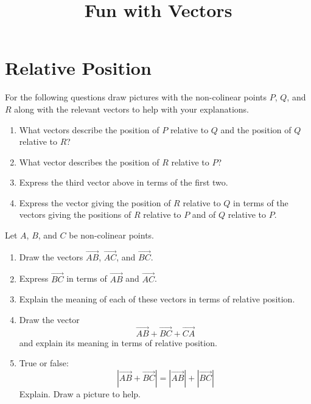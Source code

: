 \documentclass{ximera}
\title{Fun with Vectors}
\begin{document}
\begin{abstract}
\end{abstract}
\maketitle

\section{Relative Position}

\begin{example} \label{Ex:dlfkjef3}
For the following questions draw pictures with the non-colinear points $P$, $Q$, and $R$ along with the relevant vectors to help with your explanations.

\begin{enumerate}
\item What vectors describe the position of $P$ relative to $Q$ and the position of $Q$ relative to $R$?

\item What vector describes the position of $R$ relative to $P$?

\item Express the third vector above in terms of the first two.

\item Express the vector giving the position of $R$ relative to $Q$ in terms of the vectors giving the positions of $R$ relative to $P$ and of $Q$ relative to $P$. 
\end{enumerate}
\end{example}

\begin{example} \label{Exlfl3ef333}
Let $A$, $B$, and $C$ be non-colinear points.

\begin{enumerate}
\item Draw the vectors $\overrightarrow{AB}$, $\overrightarrow{AC}$, and $\overrightarrow{BC}$.

\item Express $\overrightarrow{BC}$ in terms of $\overrightarrow{AB}$ and $\overrightarrow{AC}$.

\item Explain the meaning of each of these vectors in terms of relative position.

\item Draw the vector 
\[
 \overrightarrow{AB} + \overrightarrow{BC} + \overrightarrow{CA}
\]
and explain its meaning in terms of relative position.

\item True or false:
\[
    \left|  \overrightarrow{AB} + \overrightarrow{BC} \right| =  \left|  \overrightarrow{AB}\right| + \left| \overrightarrow{BC} \right|
\]
Explain. Draw a picture to help.
\end{enumerate}
\end{example}
\end{document}
